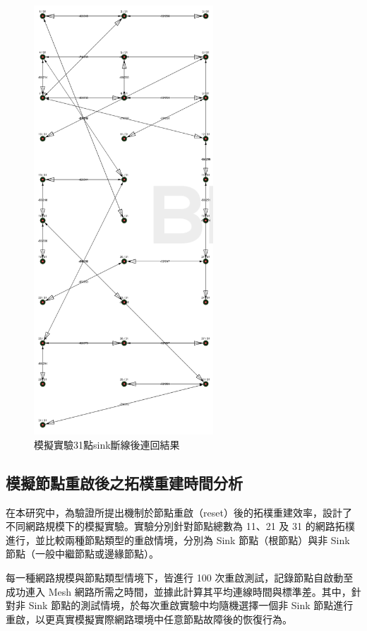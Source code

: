 \begin{ZhChapter}
\begin{figure}[H]
    \centering
    \includegraphics[width = 0.6\textwidth]{image/模擬實驗31點sink斷線後連回.png}
    \caption{模擬實驗31點sink斷線後連回結果}
    \label{fig: 模擬實驗31點sink斷線後連回}
\end{figure}


\subsection{模擬節點重啟後之拓樸重建時間分析}
在本研究中，為驗證所提出機制於節點重啟（reset）後的拓樸重建效率，設計了不同網路規模下的模擬實驗。實驗分別針對節點總數為 11、21 及 31 的網路拓樸進行，並比較兩種節點類型的重啟情境，分別為 Sink 節點（根節點）與非 Sink 節點（一般中繼節點或邊緣節點）。

每一種網路規模與節點類型情境下，皆進行 100 次重啟測試，記錄節點自啟動至成功連入 Mesh 網路所需之時間，並據此計算其平均連線時間與標準差。其中，針對非 Sink 節點的測試情境，於每次重啟實驗中均隨機選擇一個非 Sink 節點進行重啟，以更真實模擬實際網路環境中任意節點故障後的恢復行為。


\end{ZhChapter}
